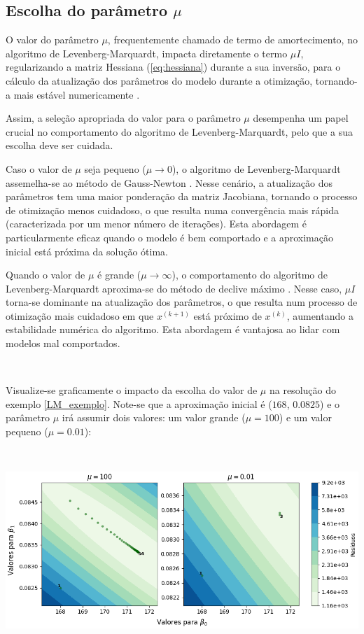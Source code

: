 \documentclass[]{article}
\numberwithin{equation}{subsection}
\begin{document}
\subsection{Escolha do parâmetro $\mu$}

O valor do parâmetro \(\mu\), frequentemente chamado de termo de
amortecimento, no algoritmo de Levenberg-Marquardt, impacta diretamente
o termo \(\mu I\), regularizando a matriz Hessiana (\ref{eq:hessiana})
durante a sua inversão, para o cálculo da atualização dos parâmetros do
modelo durante a otimização, tornando-a mais estável numericamente
\cite{MCYZBXXG17}.

Assim, a seleção apropriada do valor para o parâmetro \(\mu\) desempenha
um papel crucial no comportamento do algoritmo de Levenberg-Marquardt,
pelo que a sua escolha deve ser cuidada.

Caso o valor de \(\mu\) seja pequeno (\(\mu \rightarrow 0\)), o
algoritmo de Levenberg-Marquardt assemelha-se ao método de Gauss-Newton
\cite{SBLV18}. Nesse cenário, a atualização dos parâmetros tem uma maior
ponderação da matriz Jacobiana, tornando o processo de otimização menos
cuidadoso, o que resulta numa convergência mais rápida (caracterizada
por um menor número de iterações). Esta abordagem é particularmente
eficaz quando o modelo é bem comportado e a aproximação inicial está
próxima da solução ótima.

Quando o valor de \(\mu\) é grande (\(\mu \rightarrow \infty\)), o
comportamento do algoritmo de Levenberg-Marquardt aproxima-se do método
de declive máximo \cite{PC07}. Nesse caso, \(\mu I\) torna-se dominante
na atualização dos parâmetros, o que resulta num processo de otimização
mais cuidadoso em que \(x^{(k+1)}\) está próximo de \(x^{(k)}\),
aumentando a estabilidade numérica do algoritmo. Esta abordagem é
vantajosa ao lidar com modelos mal comportados.

\(\ \)

Visualize-se graficamente o impacto da escolha do valor de \(\mu\) na
resolução do exemplo \ref{LM_exemplo}. Note-se que a aproximação inicial
é (\(168\), \(0.0825\)) e o parâmetro \(\mu\) irá assumir dois valores:
um valor grande (\(\mu = 100\)) e um valor pequeno (\(\mu = 0.01\)):

\(\ \)

\includegraphics[width=1\linewidth]{LM_miu}
\end{document}
